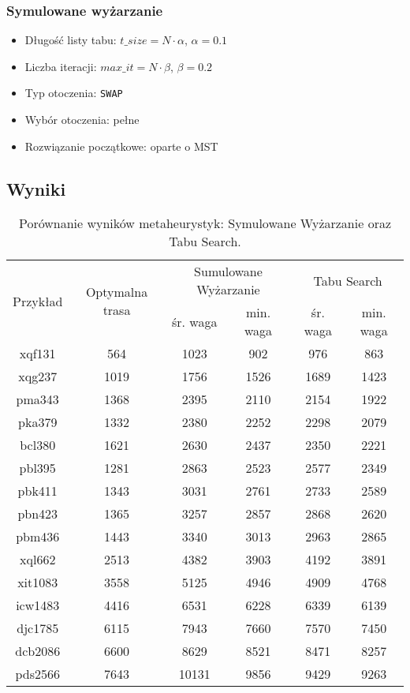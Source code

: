 \documentclass{article}
\begin{document}
\subsubsection*{Symulowane wyżarzanie}
	\begin{itemize}
		\item Długość listy tabu: $t\_size = N \cdot \alpha$, $ \alpha = 0.1$
		\item Liczba iteracji: $max\_it = N \cdot \beta$, $\beta = 0.2$
		\item Typ otoczenia: \texttt{SWAP}
		\item Wybór otoczenia: pełne
		\item Rozwiązanie początkowe: oparte o MST
	\end{itemize}

\subsection*{Wyniki}
\begin{table}[h!]
    \centering
    \begin{tabular}{|c|c|c|c|c|c|}
        \hline
        \multirow{2}{*}{Przykład} & \multirow{2}{*}{Optymalna trasa} & \multicolumn{2}{|c|}{Sumulowane Wyżarzanie}  & \multicolumn{2}{|c|}{Tabu Search}  \\
        \cline{3-6}
        & & śr. waga & min. waga & śr. waga & min. waga \\
        \hline
        xqf131 & 564 & 1023 & 902 & 976 & 863 \\
        \hline
        xqg237 & 1019 & 1756 & 1526 & 1689 & 1423 \\
        \hline
        pma343 & 1368 & 2395 & 2110 & 2154 & 1922 \\
        \hline
        pka379 & 1332 & 2380 & 2252 & 2298 & 2079 \\
        \hline
        bcl380 & 1621 & 2630 & 2437 & 2350 & 2221 \\
        \hline
        pbl395 & 1281 & 2863 & 2523 & 2577 & 2349 \\
        \hline
        pbk411 & 1343 & 3031 & 2761 & 2733 & 2589 \\
        \hline
        pbn423 & 1365 & 3257 & 2857 & 2868 & 2620 \\
        \hline
        pbm436 & 1443 & 3340 & 3013 & 2963 & 2865 \\
        \hline
        xql662 & 2513 & 4382 & 3903 & 4192 & 3891 \\
        \hline
        xit1083 & 3558 & 5125 & 4946 & 4909 & 4768 \\
        \hline
        icw1483 & 4416 & 6531 & 6228 & 6339 & 6139 \\
        \hline
        djc1785 & 6115 & 7943 & 7660 & 7570 & 7450 \\
        \hline
        dcb2086 & 6600 & 8629 & 8521 & 8471 & 8257 \\
        \hline
        pds2566 & 7643 & 10131 & 9856 & 9429 & 9263 \\
        \hline
    \end{tabular}
    \caption{Porównanie wyników metaheurystyk: Symulowane Wyżarzanie oraz Tabu Search.}
\end{table}
\end{document}
